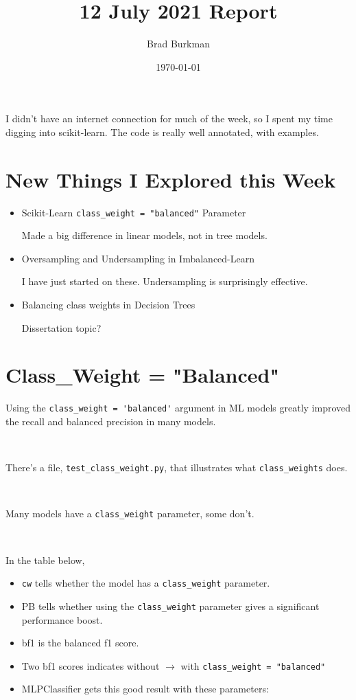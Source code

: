 \documentclass[11pt]{article}
\title{12 July 2021 Report}
\author{Brad Burkman}
\date{\today}
\begin{document}
\setlength{\parindent}{20pt}
\begin{spacing}{1.2}
\maketitle





I didn't have an internet connection for much of the week, so I spent my time digging into scikit-learn.  The code is really well annotated, with examples.  

\tableofcontents

\section{New Things I Explored this Week}

\begin{itemize}
	\item Scikit-Learn \verb|class_weight = "balanced"| Parameter
	
	Made a big difference in linear models, not in tree models.
	\item Oversampling and Undersampling in Imbalanced-Learn
	
	I have just started on these.  Undersampling is surprisingly effective.  
	\item Balancing class weights in Decision Trees
	
	Dissertation topic?
\end{itemize}

\section{Class\_Weight = "Balanced"}

Using the \verb|class_weight = 'balanced'| argument in ML models greatly improved the recall and balanced precision in many models.  

\

There's a file, \verb|test_class_weight.py|, that illustrates what \verb|class_weights| does.  

\

Many models have a \verb|class_weight| parameter, some don't.  

\

In the table below, 

\begin{itemize}
	\item \verb|cw| tells whether the model has a \verb|class_weight| parameter.
	\item PB tells whether using the \verb|class_weight| parameter gives a significant performance boost.  
	\item bf1 is the balanced f1 score.
	\item Two bf1 scores indicates without $\to$ with \verb|class_weight = "balanced"|
	\item MLPClassifier gets this good result with these parameters:
	

\end{itemize}
\end{spacing}
\end{document}
